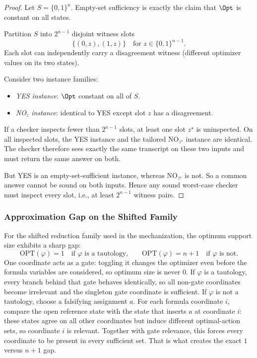 \begin{proof}
Let $S=\{0,1\}^n$. Empty-set sufficiency is exactly the claim that $\Opt$ is constant on all states.

Partition $S$ into $2^{n-1}$ disjoint witness slots
\[
\{(0,z),(1,z)\}\quad\text{for }z\in\{0,1\}^{n-1}.
\]
Each slot can independently carry a disagreement witness (different optimizer values on its two states).

Consider two instance families:
\begin{itemize}
\item \emph{YES instance}: $\Opt$ constant on all of $S$.
\item \emph{NO$_z$ instance}: identical to YES except slot $z$ has a disagreement.
\end{itemize}

If a checker inspects fewer than $2^{n-1}$ slots, at least one slot $z^\star$ is uninspected. On all inspected slots, the YES instance and the tailored NO$_{z^\star}$ instance are identical. The checker therefore sees exactly the same transcript on these two inputs and must return the same answer on both.

But YES is an empty-set-sufficient instance, whereas NO$_{z^\star}$ is not. So a common answer cannot be sound on both inputs. Hence any sound worst-case checker must inspect every slot, i.e., at least $2^{n-1}$ witness pairs.
\end{proof}

\subsubsection{Approximation Gap on the Shifted Family}

For the shifted reduction family used in the mechanization, the optimum support size exhibits a sharp gap:
\[
\mathrm{OPT}(\varphi)=1 \quad \text{if $\varphi$ is a tautology,}
\qquad
\mathrm{OPT}(\varphi)=n+1 \quad \text{if $\varphi$ is not.}
\]
One coordinate acts as a gate: toggling it changes the optimizer even before the formula variables are considered, so optimum size is never $0$. If $\varphi$ is a tautology, every branch behind that gate behaves identically, so all non-gate coordinates become irrelevant and the singleton gate coordinate is sufficient. If $\varphi$ is not a tautology, choose a falsifying assignment $a$. For each formula coordinate $i$, compare the open reference state with the state that inserts $a$ at coordinate $i$: these states agree on all other coordinates but induce different optimal-action sets, so coordinate $i$ is relevant. Together with gate relevance, this forces every coordinate to be present in every sufficient set. That is what creates the exact $1$ versus $n+1$ gap.


